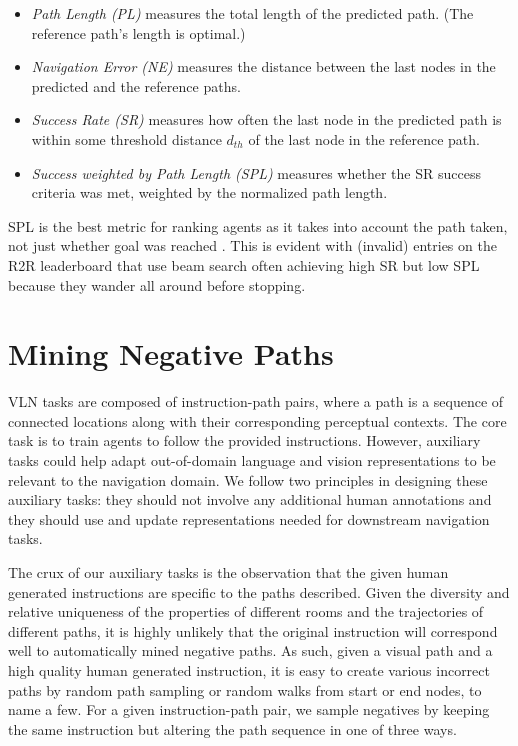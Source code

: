 \documentclass[10pt,twocolumn,letterpaper]{article}
\begin{document}
\begin{itemize}
    \setlength \itemsep{0em}
    \item \textit{Path Length (PL)} measures the total length of the predicted path. (The reference path's length is optimal.)
    \item \textit{Navigation Error (NE)} measures the distance between the last nodes in the predicted and the reference paths.
    \item \textit{Success Rate (SR)} measures how often the last node in the predicted path is within some threshold distance $d_{th}$ of the last node in the reference path.
    \item \textit{Success weighted by Path Length (SPL)} \cite{Anderson:2018:Evaluation} measures whether the SR success criteria was met, weighted by the normalized path length.
\end{itemize}

\noindent
SPL is the best metric for ranking agents as it takes into account the path taken, not just whether goal was reached \cite{Anderson:2018:Evaluation}. This is evident with (invalid) entries on the R2R leaderboard that use beam search often achieving high SR but low SPL because they wander all around before stopping. 
\section{Mining Negative Paths}
\label{sec:negative_paths}

VLN tasks are composed of instruction-path pairs, where a path is a sequence of connected locations along with their corresponding perceptual contexts. The core task is to train agents to follow the provided instructions. However, auxiliary tasks could help adapt out-of-domain language and vision representations to be relevant to the navigation domain. We follow two principles in designing these auxiliary tasks: they should not involve any additional human annotations and they should use and update representations needed for downstream navigation tasks.

The crux of our auxiliary tasks is the observation that the given human generated instructions are specific to the paths described. Given the diversity and relative uniqueness of the properties of different rooms and the trajectories of different paths, it is highly unlikely that the original instruction will correspond well to automatically mined negative paths. As such, given a visual path and a high quality human generated instruction, it is easy to create various incorrect paths by random path sampling or random walks from start or end nodes, to name a few. For a given instruction-path pair, we sample negatives by keeping the same instruction but altering the path sequence in one of three ways.
\end{document}
